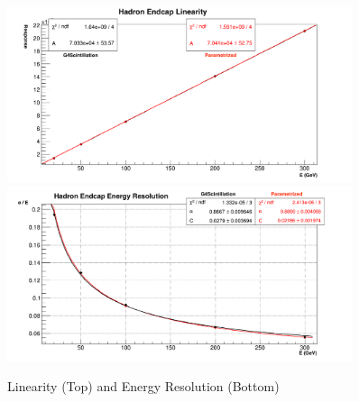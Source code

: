  \begin{figure}[hbp]
    \centering
    \includegraphics[width=0.9\textwidth]{figures/ch_simulations/he/performance/Linearity.png}
    \includegraphics[width=0.9\textwidth]{figures/ch_simulations/he/performance/Resolution.png}
    \caption{Linearity (Top) and Energy Resolution (Bottom)}
    \label{fig:simulations_he_linearityresolution}
 \end{figure}